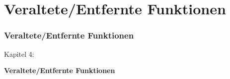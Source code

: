%

\section{Veraltete/Entfernte Funktionen}
\begin{frame}[fragile]
	\frametitle{Veraltete/Entfernte Funktionen}

	\begin{center}\huge{Kapitel 4:}\end{center}
	\begin{center}\huge{\color{typo3darkgrey}\textbf{Veraltete/Entfernte Funktionen}}\end{center}

\end{frame}


